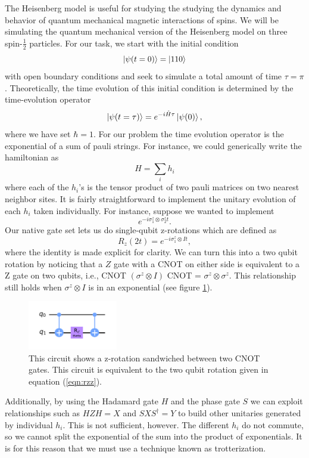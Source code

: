 \documentclass[aps,prl, reprint]{revtex4-2}
\begin{document}
The Heisenberg model is useful for studying the studying the dynamics and behavior of quantum mechanical magnetic interactions of spins. We will be simulating the quantum mechanical version of the Heisenberg model on three spin-$\frac{1}{2}$ particles. For our task, we start with the initial condition
\begin{equation}
\ket{\psi(t=0)} = \ket{110}
\end{equation}
with open boundary conditions and seek to simulate a total amount of time $\tau = \pi$. Theoretically, the time evolution of this initial condition is determined by the time-evolution operator
\begin{equation}
\ket{\psi(t=\tau)} = e^{-i \hat{H} \tau}\ket{\psi(0)},
\end{equation}
where we have set $\hbar = 1$. For our problem the time evolution operator is the exponential of a sum of pauli strings. For instance, we could generically write the hamiltonian as
\begin{equation}
H = \sum_i h_i
\end{equation}
where each of the $h_i$'s is the tensor product of two pauli matrices on two nearest neighbor sites. It is fairly straightforward to implement the unitary evolution of each $h_i$ taken individually. For instance, suppose we wanted to implement
\begin{equation}
e^{-i \sigma^{z}_1 \otimes \sigma^{z}_2 t}.
\label{eqn:rzz}
\end{equation}
Our native gate set lets us do single-qubit z-rotations which are defined as
\begin{equation}
R_{z}(2t)=e^{-i \sigma^{z}_1 \otimes I t },
\end{equation}
where the identity is made explicit for clarity. We can turn this into a two qubit rotation by noticing that a $Z$ gate with a CNOT on either side is equivalent to a Z gate on two qubits, i.e., CNOT $(\sigma^{z} \otimes I)$ CNOT = $\sigma^{z} \otimes \sigma^{z}$. This relationship still holds when $\sigma^{z} \otimes I$ is in an exponential (see figure \ref{fig:rzz}). 
\begin{figure}
\includegraphics[width=0.35\textwidth]{Rzz.png}
\caption{This circuit shows a z-rotation sandwiched between two CNOT gates. This circuit is equivalent to the two qubit rotation given in equation (\ref{eqn:rzz}).}
\label{fig:rzz}
\end{figure}
Additionally, by using the Hadamard gate $H$ and the phase gate $S$ we can exploit relationships such as $HZH = X$ and $S X S^{\dagger}=Y$ to build other unitaries generated by individual $h_i$. This is not sufficient, however. The different $h_i$ do not commute, so we cannot split the exponential of the sum into the product of exponentials. It is for this reason that we must use a technique known as trotterization.
\end{document}
